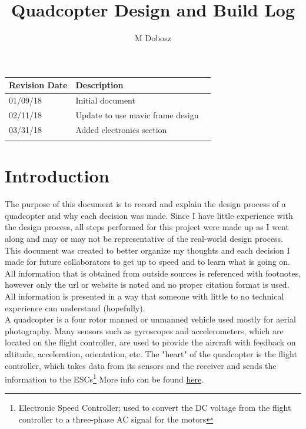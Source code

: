 \documentclass[12pt]{article}
\title{Quadcopter Design and Build Log}
\author{M Dobosz}
\begin{document}
\begin{titlepage}
\vspace*{-4.5cm}
\hspace*{-4.1cm}
{\let\newpage\relax\maketitle}

\begin{table}[b]
\begin{center}
\begin{tabular}{| l | l | l |}
\hline
\textbf{Revision Date} & \textbf{Description} \\ \hline
01/09/18 & Initial document \\ \hline
02/11/18 & Update to use mavic frame design \\ \hline
03/31/18 & Added electronics section \\ \hline
& \\ \hline

\end{tabular}
\end{center}
\end{table}
\end{titlepage}


\pagebreak
\tableofcontents
\pagebreak

\section{Introduction}

The purpose of this document is to record and explain the design process of a quadcopter and why each decision was made. Since I have little experience with the design process, all steps performed for this project were made up as I went along and may or may not be representative of the real-world design process. This document was created to better organize my thoughts and each decision I made for future collaborators to get up to speed and to learn what is going on. All information that is obtained from outside sources is referenced with footnotes, however only the url or website is noted and no proper citation format is used. All information is presented in a way that someone with little to no technical experience can understand (hopefully).
\\

A quadcopter is a four rotor manned or unmanned vehicle used mostly for aerial photography. Many sensors such as gyroscopes and accelerometers, which are located on the flight controller, are used to provide the aircraft with feedback on altitude, acceleration, orientation, etc. The "heart" of the quadcopter is the flight controller, which takes data from its sensors and the receiver and sends the information to the ESCs\footnote{Electronic Speed Controller; used to convert the DC voltage from the flight controller to a three-phase AC signal for the motors} More info can be found \href{https://en.wikipedia.org/wiki/Quadcopter}{\color{cyan}here}.
\\
\end{document}
